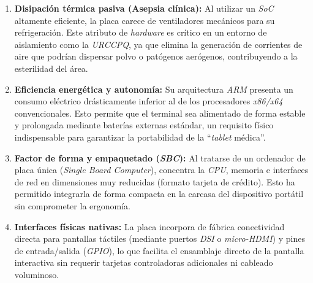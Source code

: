 \begin{enumerate}
    \item \textbf{Disipación térmica pasiva (Asepsia clínica):} Al utilizar un \textit{SoC} altamente eficiente, la placa carece de ventiladores mecánicos para su refrigeración. Este atributo de \textit{hardware} es crítico en un entorno de aislamiento como la \textit{URCCPQ}, ya que elimina la generación de corrientes de aire que podrían dispersar polvo o patógenos aerógenos, contribuyendo a la esterilidad del área.
    \item \textbf{Eficiencia energética y autonomía:} Su arquitectura \textit{ARM} presenta un consumo eléctrico drásticamente inferior al de los procesadores \textit{x86/x64} convencionales. Esto permite que el terminal sea alimentado de forma estable y prolongada mediante baterías externas estándar, un requisito físico indispensable para garantizar la portabilidad de la ``\textit{tablet} médica''.
    \item \textbf{Factor de forma y empaquetado (\textit{SBC}):} Al tratarse de un ordenador de placa única (\textit{Single Board Computer}), concentra la \textit{CPU}, memoria e interfaces de red en dimensiones muy reducidas (formato tarjeta de crédito). Esto ha permitido integrarla de forma compacta en la carcasa del dispositivo portátil sin comprometer la ergonomía.
    \item \textbf{Interfaces físicas nativas:} La placa incorpora de fábrica conectividad directa para pantallas táctiles (mediante puertos \textit{DSI} o \textit{micro-HDMI}) y pines de entrada/salida (\textit{GPIO}), lo que facilita el ensamblaje directo de la pantalla interactiva sin requerir tarjetas controladoras adicionales ni cableado voluminoso.
\end{enumerate}
